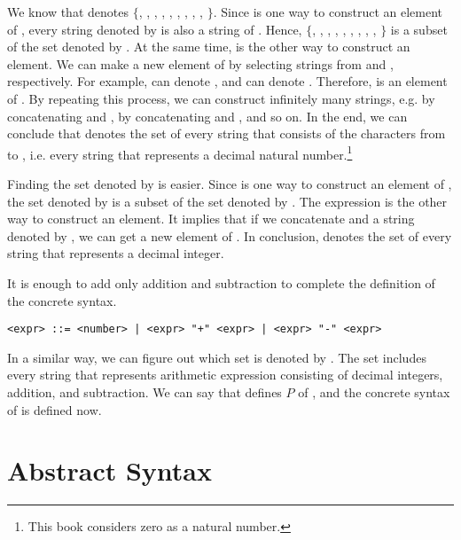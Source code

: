 We know that  denotes
$\{$, , , , ,
, , , , $\}$.
Since  is one way to construct an element of , every
string denoted by  is also a string of . Hence,
$\{$, , , , ,
, , , , $\}$
is a subset of the set denoted by . At the same time, 
 is the other way to construct an element. We can make a new element
of  by selecting strings from  and ,
respectively. For example,  can denote , and
 can denote . Therefore,  is an element of
. By repeating this process, we can construct infinitely many
strings, e.g.  by concatenating  and ,
 by concatenating  and , and so on. In the
end, we can conclude that  denotes the set of every string that
consists of the characters from  to , i.e. every string that
represents a decimal natural number.\footnote{This book considers zero as a
natural number.}

Finding the set denoted by  is easier. Since  is one
way to construct an element of , the set denoted by 
is a subset of the set denoted by . The expression   is
the other way to construct an element. It implies that if we concatenate
 and a string denoted by , we can get a new element of
. In conclusion,  denotes the set of every string
that represents a decimal integer.

It is enough to add only addition and subtraction to complete the definition of
the concrete syntax.

\begin{verbatim}
<expr> ::= <number> | <expr> "+" <expr> | <expr> "-" <expr>
\end{verbatim}

In a similar way, we can figure out which set is denoted by . The
set includes every string that represents arithmetic expression consisting of
decimal integers, addition, and subtraction. We can say that 
defines $P$ of \Lang, and the concrete syntax of \Lang is defined now.

\section{Abstract Syntax}

